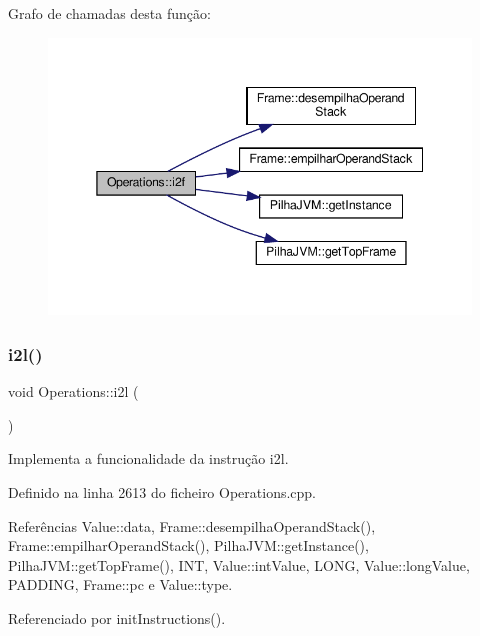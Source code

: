 Grafo de chamadas desta função\+:\nopagebreak
\begin{figure}[H]
\begin{center}
\leavevmode
\includegraphics[width=345pt]{classOperations_a4880878630a620c325840fc7980dc131_cgraph}
\end{center}
\end{figure}
\mbox{\label{classOperations_ae5d28665a74411cbb880e3007c5405e8}} 
\subsubsection{\texorpdfstring{i2l()}{i2l()}}
{\footnotesize\ttfamily void Operations\+::i2l (\begin{DoxyParamCaption}{ }\end{DoxyParamCaption})\hspace{0.3cm}{\ttfamily [private]}}



Implementa a funcionalidade da instrução i2l. 



Definido na linha 2613 do ficheiro Operations.\+cpp.



Referências Value\+::data, Frame\+::desempilha\+Operand\+Stack(), Frame\+::empilhar\+Operand\+Stack(), Pilha\+J\+V\+M\+::get\+Instance(), Pilha\+J\+V\+M\+::get\+Top\+Frame(), I\+NT, Value\+::int\+Value, L\+O\+NG, Value\+::long\+Value, P\+A\+D\+D\+I\+NG, Frame\+::pc e Value\+::type.



Referenciado por init\+Instructions().

